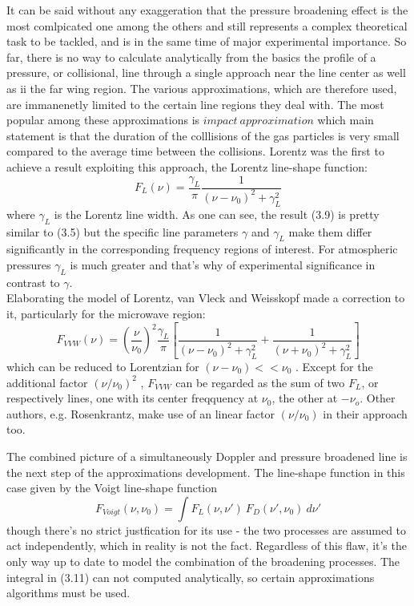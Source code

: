 It can be said without any exaggeration that the pressure broadening
effect is the most comlpicated one among the others and still
represents a complex theoretical task to be tackled, and is in the
same time of major experimental importance. So far, there is no way to
calculate analytically from the basics the profile of a pressure, or
collisional, line through a single approach near the line center as well
as ii the far wing region. The various approximations, which are
therefore used, are immanenetly limited to the certain line regions
they deal with.
The most popular among these approximations is $impact~approximation$
which main statement is that the duration of the colllisions of the
gas particles is very small compared to the average time between the
collisions. Lorentz was the first to achieve a result exploiting this
approach, the Lorentz line-shape function:
\begin{equation}
 F_L(\nu)=\frac{\gamma_L}{\pi}\frac{1}{(\nu-\nu_0)^2+\gamma_L^2}
\label{}
\end{equation}
where $\gamma_L$ is the Lorentz line width. As one can see, the result
(3.9) is pretty similar to (3.5) but the specific line parameters
$\gamma$ and $\gamma_L$ make them differ significantly in the
corresponding frequency regions of interest. For atmospheric pressures
$\gamma_L$ is much greater and that's why of experimental significance
in contrast to $\gamma$.\\
Elaborating the model of Lorentz, van Vleck and Weisskopf made a correction to it, particularly
for the microwave region:
\begin{equation}
 F_{VVW} (\nu)=\left(\frac{\nu}{\nu_0}\right)^2\frac{\gamma_L}{\pi}\left[\frac{1}{(\nu-\nu_0)^2+\gamma_L^2}+\frac{1}{(\nu+\nu_0)^2+\gamma_L^2}\right]
\label{}
\end{equation}
which can be reduced to Lorentzian for $(\nu-\nu_0) << \nu_0$ . Except
for the additional factor $(\nu/\nu_0)^2$ ,  $F_{VVW}$ can be regarded
as the sum of two $F_L$, or respectively lines, one with its center
freqquency at  $\nu_0$, the other at $-\nu_o$. Other authors,
e.g. Rosenkrantz,  make use of an linear factor $(\nu/\nu_0)$ in their
approach too.

The combined picture of a simultaneously Doppler and pressure
broadened line is the next step of the approximations development. The
line-shape function in this case given by the Voigt line-shape
function 
\begin{equation}
 F_{Voigt}(\nu,\nu_0)= \int F_L(\nu,\nu')~F_D(\nu',\nu_0)~d\nu'
\label{}
\end{equation}
though there's no strict justfication for its use - the two processes
are assumed to act independently, which in reality is not the
fact. Regardless of this flaw, it's the only way up to date to model
the combination of the broadening processes. The integral in (3.11)
can not computed analytically, so certain approximations algorithms
must be used.


